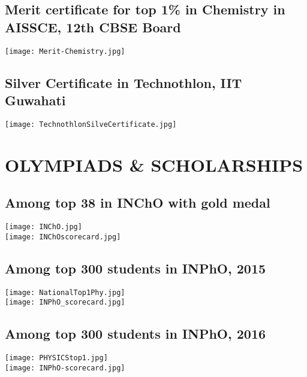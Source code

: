 \documentclass{article}
\begin{document}
	\subsection{Merit certificate for top 1\% in Chemistry in AISSCE, 12th CBSE Board}
	\begin{center}
\vspace{20pt}
		\texttt{[image: Merit-Chemistry.jpg]}{\centering}
	\end{center}
	\subsection{Silver Certificate in Technothlon, IIT Guwahati}
	\begin{center}
		\texttt{[image: TechnothlonSilveCertificate.jpg]}{\centering}
	\end{center}
	
	\section{OLYMPIADS \& SCHOLARSHIPS}
	\subsection{Among top 38 in INChO with gold medal}
	\begin{center}
			\texttt{[image: INChO.jpg]}{\centering}\\
		\texttt{[image: INChOscorecard.jpg]}{\centering}
	\end{center}
	\subsection{Among top 300 students in INPhO, 2015 }
\begin{center}
	\texttt{[image: NationalTop1Phy.jpg]}{\centering}\\
	\texttt{[image: INPhO\_scorecard.jpg]}{\centering}
\end{center}
\subsection{Among top 300 students in INPhO, 2016 }
\begin{center}
	\texttt{[image: PHYSICStop1.jpg]}{\centering}\\
	\texttt{[image: INPhO-scorecard.jpg]}{\centering}
\end{center}
\end{document}

